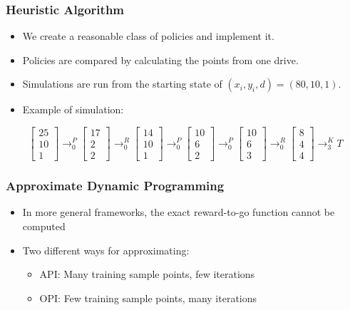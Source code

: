 \documentclass{beamer}
\begin{document}
\begin{frame}
\frametitle{Heuristic Algorithm}
\begin{itemize}
\item We create a reasonable class of policies and implement it. 
\item Policies are compared by calculating the points from one drive.
\item Simulations are run from the starting state of $(x_{i},y_{i},d) = (80, 10, 1)$.
\pause
\item Example of simulation:
\end{itemize}
$$
\begin{bmatrix} 25\\[0.3em] 10 \\[0.3em] 1 \end{bmatrix}
\longrightarrow_0^P
\begin{bmatrix} 17\\[0.3em] 2 \\[0.3em] 2 \end{bmatrix}
\longrightarrow_0^R
\begin{bmatrix} 14\\[0.3em] 10 \\[0.3em] 1 \end{bmatrix}
\longrightarrow_0^P
\begin{bmatrix} 10\\[0.3em] 6 \\[0.3em] 2 \end{bmatrix}
\longrightarrow_0^P
\begin{bmatrix} 10\\[0.3em] 6 \\[0.3em] 3 \end{bmatrix}
\longrightarrow_0^R
\begin{bmatrix} 8\\[0.3em] 4 \\[0.3em] 4 \end{bmatrix}
\longrightarrow_3^K
T
$$
\end{frame}

\begin{frame}
\frametitle{Approximate Dynamic Programming}
\begin{itemize}
\item In more general frameworks, the exact reward-to-go function cannot be computed
\item Two different ways for approximating:
\begin{itemize}
\item API: Many training sample points, few iterations
\item OPI: Few training sample points, many iterations
\end{itemize}
\end{itemize}
\end{frame}
\end{document}
